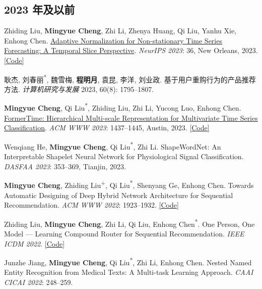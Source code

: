 \documentclass[UTF8,fontset=fandol,scheme=plain,11pt,a4paper]{ctexart}
\newcommand{\pubentry}[1]{\item \begin{minipage}[t]{\linewidth}#1\end{minipage}}
\begin{document}
\subsection{2023 年及以前}
\begin{publist}[start=54]
\pubentry{Zhiding Liu, \textbf{Mingyue Cheng}, Zhi Li, Zhenya Huang, Qi Liu, Yanhu Xie, Enhong Chen. \href{https://mingyue-cheng.github.io/files/papers/san-neurips2024.pdf}{Adaptive Normalization for Non-stationary Time Series Forecasting: A Temporal Slice Perspective}. \emph{NeurIPS 2023}: 36, New Orleans, 2023. \href{https://github.com/icantnamemyself/SAN}{[Code]}}

\pubentry{耿杰, 刘春丽\textsuperscript{*}, 魏雪梅, \textbf{程明月}, 袁昆, 李洋, 刘业政. 基于用户重购行为的产品推荐方法. \emph{计算机研究与发展} 2023, 60(8): 1795--1807.}

\pubentry{\textbf{Mingyue Cheng}, Qi Liu\textsuperscript{*}, Zhiding Liu, Zhi Li, Yucong Luo, Enhong Chen. \href{https://mingyue-cheng.github.io/files/papers/formertime-www2023.pdf}{FormerTime: Hierarchical Multi-scale Representation for Multivariate Time Series Classification}. \emph{ACM WWW 2023}: 1437--1445, Austin, 2023. \href{https://github.com/Mingyue-Cheng/FormerTime}{[Code]}}

\pubentry{Wenqiang He, \textbf{Mingyue Cheng}, Qi Liu\textsuperscript{*}, Zhi Li. ShapeWordNet: An Interpretable Shapelet Neural Network for Physiological Signal Classification. \emph{DASFAA 2023}: 353--369, Tianjin, 2023.}

\pubentry{\textbf{Mingyue Cheng}, Zhiding Liu\textsuperscript{+}, Qi Liu\textsuperscript{*}, Shenyang Ge, Enhong Chen. Towards Automatic Designing of Deep Hybrid Network Architecture for Sequential Recommendation. \emph{ACM WWW 2022}: 1923--1932. \href{https://github.com/Mingyue-Cheng/NASR}{[Code]}}

\pubentry{Zhiding Liu, \textbf{Mingyue Cheng}, Zhi Li, Qi Liu, Enhong Chen\textsuperscript{*}. One Person, One Model --- Learning Compound Router for Sequential Recommendation. \emph{IEEE ICDM 2022}. \href{https://github.com/Mingyue-Cheng/CANet}{[Code]}}

\pubentry{Junzhe Jiang, \textbf{Mingyue Cheng}, Qi Liu\textsuperscript{*}, Zhi Li, Enhong Chen. Nested Named Entity Recognition from Medical Texts: A Multi-task Learning Approach. \emph{CAAI CICAI 2022}: 248--259.}


\end{publist}
\end{document}
